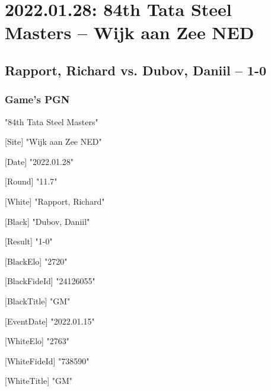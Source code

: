 \documentclass[9pt]{extarticle}
\begin{document}
\setlength{\columnsep}{32pt}
\section*{2022.01.28: 84th Tata Steel Masters -- Wijk aan Zee NED}

\subsection*{Rapport, Richard vs. Dubov, Daniil -- 1-0}
\subsubsection*{Game's PGN}
\begin{flushleft}
[Event] "84th Tata Steel Masters"

[Site] "Wijk aan Zee NED"

[Date] "2022.01.28"

[Round] "11.7"

[White] "Rapport, Richard"

[Black] "Dubov, Daniil"

[Result] "1-0"

[BlackElo] "2720"

[BlackFideId] "24126055"

[BlackTitle] "GM"

[EventDate] "2022.01.15"

[WhiteElo] "2763"

[WhiteFideId] "738590"

[WhiteTitle] "GM"

\end{flushleft}
\parindent 0mm
\end{document}
